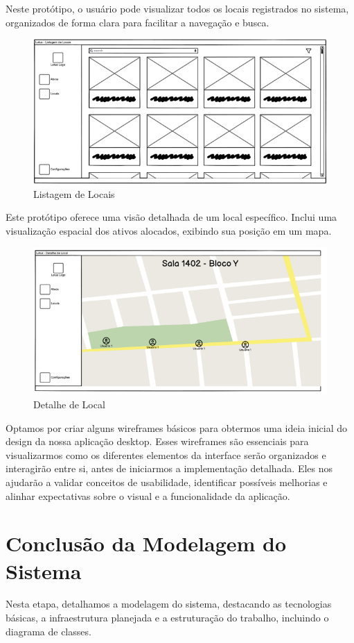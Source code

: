 Neste protótipo, o usuário pode visualizar todos os locais registrados no sistema, organizados de forma clara para facilitar a navegação e busca.


\begin{figure}[H]
    \centering
    \includegraphics[width=1\linewidth]{figuras/listarlocais.png}
    \caption{Listagem de Locais}
    \label{fig:mockup3}
\end{figure}

Este protótipo oferece uma visão detalhada de um local específico. Inclui uma visualização espacial dos ativos alocados, exibindo sua posição em um mapa.

\begin{figure}[H]
    \centering
    \includegraphics[width=1\linewidth]{figuras/detalheslocal.png}
    \caption{Detalhe de Local}
    \label{fig:mockup3}
\end{figure}


Optamos por criar alguns wireframes básicos para obtermos uma ideia inicial do design da nossa aplicação desktop. Esses wireframes são essenciais para visualizarmos como os diferentes elementos da interface serão organizados e interagirão entre si, antes de iniciarmos a implementação detalhada. Eles nos ajudarão a validar conceitos de usabilidade, identificar possíveis melhorias e alinhar expectativas sobre o visual e a funcionalidade da aplicação.




\section{Conclusão da Modelagem do Sistema}

Nesta etapa, detalhamos a modelagem do sistema, destacando as tecnologias básicas, a infraestrutura planejada e a estruturação do trabalho, incluindo o diagrama de classes.

